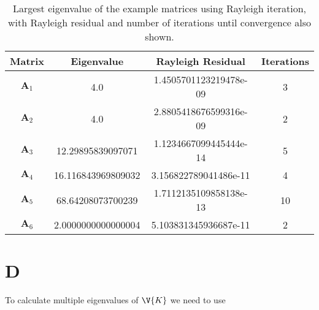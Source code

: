 \documentclass[a4paper,10pt]{article}
\begin{document}
	\begin{table}[H]
		\centering
		\begin{tabular}{c|c|c|c}
			Matrix & Eigenvalue & Rayleigh Residual & Iterations \\
			\hline
			$ \textbf{A}_1 $ & 4.0 &1.4505701123219478e-09 & 3\\
			$ \textbf{A}_2 $ & 4.0 &2.8805418676599316e-09 & 2\\
			$ \textbf{A}_3 $ & 12.29895839097071 & 1.1234667099445444e-14 & 5\\
			$ \textbf{A}_4 $ & 16.116843969809032 & 3.156822789041486e-11 & 4\\
			$ \textbf{A}_5 $ & 68.64208073700239 & 1.7112135109858138e-13 & 10\\
			$ \textbf{A}_6 $ & 2.0000000000000004 & 5.103831345936687e-11 & 2
		\end{tabular}
		\caption{Largest eigenvalue of the example matrices using Rayleigh iteration, with Rayleigh residual and number of iterations until convergence also shown.}
		\label{tab:rayleigh_iter}
	\end{table}
	
	
	\section*{D}
	To calculate multiple eigenvalues of $ \V{K} $ we need to use 
	
	
	
	
	
\end{document}
